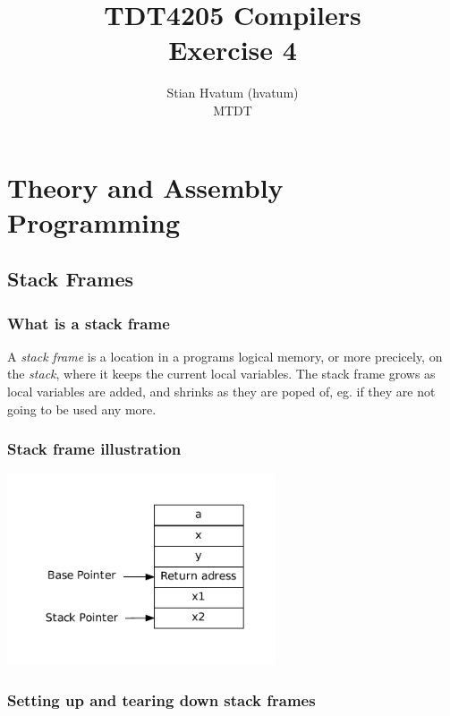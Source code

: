 \documentclass[english,a4paper]{scrartcl}
\title{TDT4205 Compilers\\
\Huge Exercise 4}
\author{Stian Hvatum (hvatum)\\MTDT}
\begin{document}
\maketitle
\tableofcontents
\section{Theory and Assembly Programming}
\subsection{Stack Frames}
\subsubsection{What is a stack frame}
A \emph{stack frame} is a location in a programs logical memory, or more
precicely, on the \emph{stack}, where it keeps the current local variables. The stack
frame grows as local variables are added, and shrinks as they are poped of, eg.
if they are not going to be used any more.

\subsubsection{Stack frame illustration}
\centerline{\includegraphics[width=300px]{stackframe.pdf}}
\subsubsection{Setting up and tearing down stack frames}

\newpage
\end{document}
